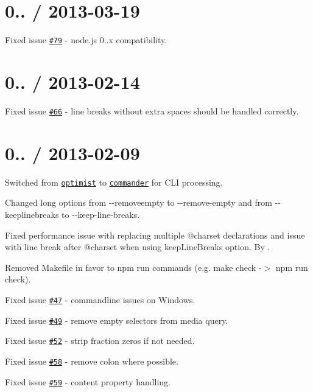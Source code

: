\section*{0.. / 2013-\/03-\/19 }


\begin{DoxyItemize}
\item Fixed issue \href{https://github.com/jakubpawlowicz/clean-css/issues/79}{\tt \#79} -\/ node.\+js 0..\+x compatibility.
\end{DoxyItemize}

\section*{0.. / 2013-\/02-\/14 }


\begin{DoxyItemize}
\item Fixed issue \href{https://github.com/jakubpawlowicz/clean-css/issues/66}{\tt \#66} -\/ line breaks without extra spaces should be handled correctly.
\end{DoxyItemize}

\section*{0.. / 2013-\/02-\/09 }


\begin{DoxyItemize}
\item Switched from \href{https://github.com/substack/node-optimist}{\tt optimist} to \href{https://github.com/visionmedia/commander.js}{\tt commander} for C\+LI processing.
\item Changed long options from {\ttfamily -\/-\/removeempty} to {\ttfamily -\/-\/remove-\/empty} and from {\ttfamily -\/-\/keeplinebreaks} to {\ttfamily -\/-\/keep-\/line-\/breaks}.
\item Fixed performance issue with replacing multiple {\ttfamily @charset} declarations and issue with line break after {\ttfamily @charset} when using {\ttfamily keep\+Line\+Breaks} option. By \href{https://github.com/rrjamie}{\tt }.
\item Removed Makefile in favor to {\ttfamily npm run} commands (e.\+g. {\ttfamily make check} -\/$>$ {\ttfamily npm run check}).
\item Fixed issue \href{https://github.com/jakubpawlowicz/clean-css/issues/47}{\tt \#47} -\/ commandline issues on Windows.
\item Fixed issue \href{https://github.com/jakubpawlowicz/clean-css/issues/49}{\tt \#49} -\/ remove empty selectors from media query.
\item Fixed issue \href{https://github.com/jakubpawlowicz/clean-css/issues/52}{\tt \#52} -\/ strip fraction zeros if not needed.
\item Fixed issue \href{https://github.com/jakubpawlowicz/clean-css/issues/58}{\tt \#58} -\/ remove colon where possible.
\item Fixed issue \href{https://github.com/jakubpawlowicz/clean-css/issues/59}{\tt \#59} -\/ content property handling.
\end{DoxyItemize}

